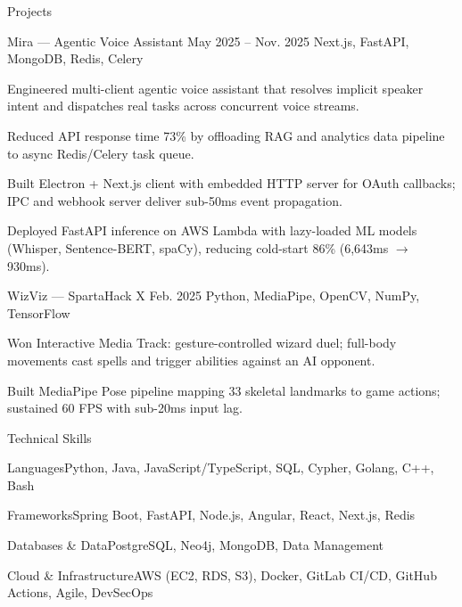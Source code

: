 \documentclass[
	11pt
]{../../../resume}
\begin{document}
	\begin{rSection}{P}{rojects}
		\begin{rSectionEntry}
			{Mira --- Agentic Voice Assistant}
			{May 2025 -- Nov. 2025}
			{}
			{Next.js, FastAPI, MongoDB, Redis, Celery}
			{}

			\item Engineered multi-client agentic voice assistant that resolves implicit speaker intent and dispatches real tasks across concurrent voice streams.
			\item Reduced API response time 73\% by offloading RAG and analytics data pipeline to async Redis/Celery task queue.
			\item Built Electron + Next.js client with embedded HTTP server for OAuth callbacks; IPC and webhook server deliver sub-50ms event propagation.
			\item Deployed FastAPI inference on AWS Lambda with lazy-loaded ML models (Whisper, Sentence-BERT, spaCy), reducing cold-start 86\% (6{,}643ms $\rightarrow$ 930ms).
		\end{rSectionEntry}

		\begin{rSectionEntry}
			{WizViz --- SpartaHack X}
			{Feb. 2025}
			{}
			{Python, MediaPipe, OpenCV, NumPy, TensorFlow}
			{}

			\item Won Interactive Media Track: gesture-controlled wizard duel; full-body movements cast spells and trigger abilities against an AI opponent.
			\item Built MediaPipe Pose pipeline mapping 33 skeletal landmarks to game actions; sustained 60 FPS with sub-20ms input lag.
		\end{rSectionEntry}
	\end{rSection}

	\begin{rSection}{T}{echnical Skills}
		\begin{rSet}{Languages}{Python, Java, JavaScript/TypeScript, SQL, Cypher, Golang, C++, Bash}
		\end{rSet}
		\begin{rSet}{Frameworks}{Spring Boot, FastAPI, Node.js, Angular, React, Next.js, Redis}
		\end{rSet}
		\begin{rSet}{Databases \& Data}{PostgreSQL, Neo4j, MongoDB, Data Management}
		\end{rSet}
		\begin{rSet}{Cloud \& Infrastructure}{AWS (EC2, RDS, S3), Docker, GitLab CI/CD, GitHub Actions, Agile, DevSecOps}
		\end{rSet}
	\end{rSection}
\end{document}
